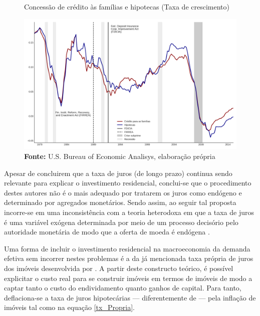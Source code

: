 \begin{figure}[htb]
	\centering
	\caption{Concessão de crédito às famílias e hipotecas (Taxa de crescimento)}
	\label{FigCreditoFDICIA}
	\includegraphics[width=\textwidth]{../../Dados/Fatos_Estilizados/figs/FDICIA.png}
	\caption*{\textbf{Fonte:} U.S. Bureau of Economic Analisys, elaboração própria}
\end{figure}
	
Apesar de \textcite{gauger_residential_2003} concluirem que a taxa de juros (de longo prazo) continua sendo relevante para explicar o investimento residencial, conclui-se que o procedimento destes autores não é o mais adequado por tratarem os juros como endógeno e determinado por agregados monetários. Sendo assim, ao seguir tal proposta incorre-se em uma inconsistência com a teoria heterodoxa em que a taxa de juros é uma variável exógena determinada por meio de um processo decisório pelo autoridade monetária de modo que a oferta de moeda é endógena \cite[p.~230--256]{lavoie_post-keynesian_2015}.

Uma forma de incluir o investimento residencial na macroeconomia da demanda efetiva sem incorrer nestes problemas é a da já mencionada taxa própria de juros dos imóveis desenvolvida por \textcite{teixeira_crescimento_2015}. A partir deste constructo teórico, é possível explicitar o custo real para se construir imóveis em termos de imóveis de modo a captar tanto o custo do endividamento quanto ganhos de capital.
Para tanto, deflaciona-se a taxa de juros hipotecárias --- diferentemente de \textcite[p.~143--146]{fair_macroeconometric_2013} --- pela inflação de imóveis tal como na equação \ref{tx_Propria}.


